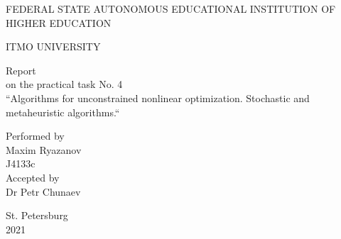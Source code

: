 \documentclass[12pt,a4paper]{report}
\begin{document}
	\vspace*{15ex}
	\begin{center}
		FEDERAL STATE AUTONOMOUS EDUCATIONAL INSTITUTION OF HIGHER EDUCATION 
		
		ITMO UNIVERSITY
		\vspace*{30ex}
		
		Report\\
		on the practical task No. 4\\
		``Algorithms for unconstrained nonlinear optimization. Stochastic and
		metaheuristic algorithms.``
	\end{center}
	\vspace{25ex}
	\begin{flushright}
		Performed by\\
		Maxim Ryazanov\\
		J4133c\\
		Accepted by\\
		Dr Petr Chunaev
	\end{flushright}
	\vspace{20ex}
	\begin{center}
		St. Petersburg\\
		2021
	\end{center}
	\newpage

    
	
	
	
	
\end{document}
